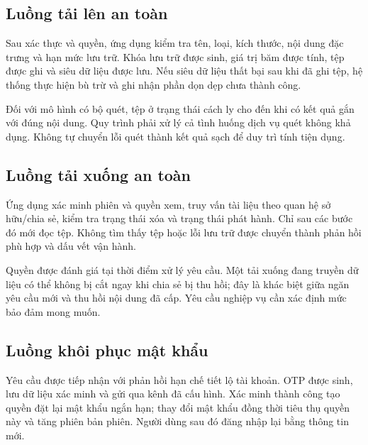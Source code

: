 \subsection{Luồng tải lên an toàn}
Sau xác thực và quyền, ứng dụng kiểm tra tên, loại, kích thước, nội dung đặc trưng và hạn mức lưu trữ. Khóa lưu trữ được sinh, giá trị băm được tính, tệp được ghi và siêu dữ liệu được lưu. Nếu siêu dữ liệu thất bại sau khi đã ghi tệp, hệ thống thực hiện bù trừ và ghi nhận phần dọn dẹp chưa thành công.

Đối với mô hình có bộ quét, tệp ở trạng thái cách ly cho đến khi có kết quả gắn với đúng nội dung. Quy trình phải xử lý cả tình huống dịch vụ quét không khả dụng. Không tự chuyển lỗi quét thành kết quả sạch để duy trì tính tiện dụng.
\subsection{Luồng tải xuống an toàn}
Ứng dụng xác minh phiên và quyền xem, truy vấn tài liệu theo quan hệ sở hữu/chia sẻ, kiểm tra trạng thái xóa và trạng thái phát hành. Chỉ sau các bước đó mới đọc tệp. Không tìm thấy tệp hoặc lỗi lưu trữ được chuyển thành phản hồi phù hợp và dấu vết vận hành.

Quyền được đánh giá tại thời điểm xử lý yêu cầu. Một tải xuống đang truyền dữ liệu có thể không bị cắt ngay khi chia sẻ bị thu hồi; đây là khác biệt giữa ngăn yêu cầu mới và thu hồi nội dung đã cấp. Yêu cầu nghiệp vụ cần xác định mức bảo đảm mong muốn.
\subsection{Luồng khôi phục mật khẩu}
Yêu cầu được tiếp nhận với phản hồi hạn chế tiết lộ tài khoản. OTP được sinh, lưu dữ liệu xác minh và gửi qua kênh đã cấu hình. Xác minh thành công tạo quyền đặt lại mật khẩu ngắn hạn; thay đổi mật khẩu đồng thời tiêu thụ quyền này và tăng phiên bản phiên. Người dùng sau đó đăng nhập lại bằng thông tin mới.

